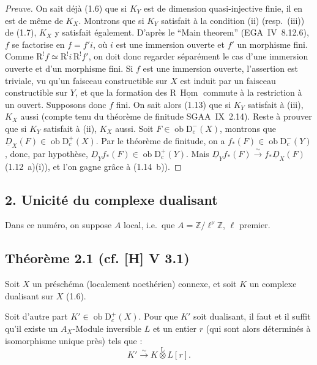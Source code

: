 \documentclass[11pt]{article}
\DeclareMathOperator{\Hom}{Hom}
\newcommand{\R}{\mathrm{R}}
\newcommand{\D}{\mathrm{D}}
\newcommand{\Z}{\mathbb{Z}}
\newcommand{\ob}{\operatorname{ob}}
\providecommand{\Hom}{\operatorname{Hom}}
\providecommand{\ob}{\operatorname{ob}}
\providecommand{\R}{\mathrm R}
\providecommand{\Z}{\mathbb Z}
\begin{document}
\begin{proof}[Preuve]
On sait déjà (1.6) que si $K_Y$ est de dimension quasi-injective finie, il en est de même de $K_X$. Montrons que si $K_Y$ satisfait à la condition (ii) (resp.~(iii)) de (1.7), $K_X$ y satisfait également. D'après le ``Main theorem'' (EGA~IV~8.12.6), $f$ se factorise en $f = f'i$, où $i$ est une immersion ouverte et $f'$ un morphisme fini. Comme $\R^{!}f \simeq \R^{!}i \, \R^{!}f'$, on doit donc regarder séparément le cas d'une immersion ouverte et d'un morphisme fini. Si $f$ est une immersion ouverte, l'assertion est triviale, vu qu'un faisceau constructible sur $X$ est induit par un faisceau constructible sur $Y$, et que la formation des $\R\,\underline{\Hom}$ commute à la restriction à un ouvert. Supposons donc $f$ fini. On sait alors (1.13) que si $K_Y$ satisfait à (iii), $K_X$ aussi (compte tenu du théorème de finitude SGAA~IX~2.14). Reste à prouver que si $K_Y$ satisfait à (ii), $K_X$ aussi. Soit $F \in \ob \D_c^{-}(X)$, montrons que $\underline{D}_X(F) \in \ob \D_c^{+}(X)$. Par le théorème de finitude, on a $f_{*}(F) \in \ob \D_c^{-}(Y)$, donc, par hypothèse, $\underline{D}_Y f_{*}(F) \in \ob \D_c^{+}(Y)$. Mais $\underline{D}_Y f_{*}(F) \xrightarrow{\sim} f_{*}\underline{D}_X(F)$ (1.12~a)(i)), et l'on gagne grâce à (1.14~b)).
\end{proof}

\subsection{2. Unicité du complexe dualisant}

Dans ce numéro, on suppose $A$ local, i.e.~que $A = \Z/\ell^{\nu}\Z$, $\ell$ premier.

\subsection*{Théorème 2.1 (cf. [H] V 3.1)}
Soit $X$ un préschéma (localement noethérien) connexe, et soit $K$ un complexe dualisant sur $X$ (1.6).

Soit d'autre part $K' \in \ob \D_c^{+}(X)$. Pour que $K'$ soit dualisant, il faut et il suffit qu'il existe un $A_X$-Module inversible $L$ et un entier $r$ (qui sont alors déterminés à isomorphisme unique près) tels que :
\[
K' \xrightarrow{\sim} K \mathop{\otimes}\limits^{\mathrm{L}} L[r].
\]
\end{document}
